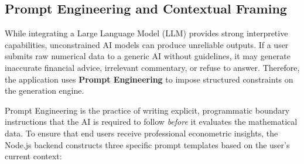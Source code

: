 \subsection{Prompt Engineering and Contextual Framing}
While integrating a Large Language Model (LLM) provides strong interpretive capabilities, unconstrained AI models can produce unreliable outputs. If a user submits raw numerical data to a generic AI without guidelines, it may generate inaccurate financial advice, irrelevant commentary, or refuse to answer. Therefore, the application uses \textbf{Prompt Engineering} to impose structured constraints on the generation engine. 

Prompt Engineering is the practice of writing explicit, programmatic boundary instructions that the AI is required to follow \textit{before} it evaluates the mathematical data. To ensure that end users receive professional econometric insights, the Node.js backend constructs three specific prompt templates based on the user's current context:

